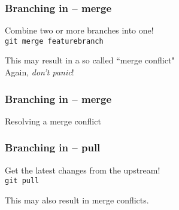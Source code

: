 \documentclass{beamer}
\begin{document}
\begin{frame}
  \frametitle{Branching in -- merge} %

    Combine two or more branches into one! \\[1em]

    \texttt{git merge featurebranch} \\[3em]

    \pause

    This may result in a so called ``\alert{merge conflict}" \\[1em]

    Again, \emph{don't panic}!
\end{frame}

\begin{frame}
  \frametitle{Branching in -- merge} %

    Resolving a merge conflict \\[1em]



\end{frame}

\begin{frame}
  \frametitle{Branching in -- pull}
    Get the latest changes from the upstream! \\[1em]

    \texttt{git pull} \\[3em]

    \pause

    This may also result in \alert{merge conflicts}. \\[1em]
\end{frame}
\end{document}

